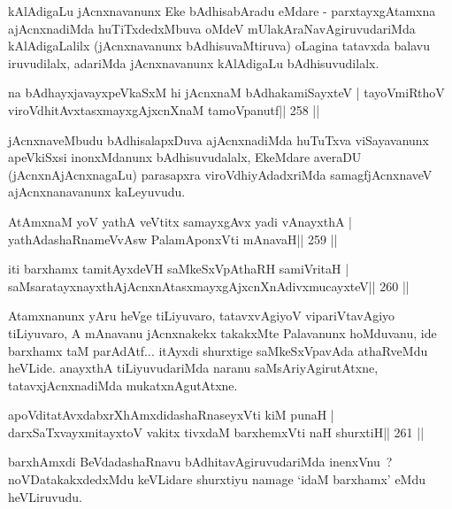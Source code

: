\begin{artha}
kAlAdigaLu jAcnxnavanunx Eke bAdhisabAradu eMdare - parxtayxgAtamxna ajAcnxnadiMda huTiTxdedxMbuva oMdeV mUlakAraNavAgiruvudariMda kAlAdigaLalilx (jAcnxnavanunx bAdhisuvaMtiruva) oLagina tatavxda balavu iruvudilalx, adariMda jAcnxnavanunx kAlAdigaLu bAdhisuvudilalx.
\end{artha}

\begin{shl}
na bAdhayxjavayxpeVkaSxM hi jAcnxnaM bAdhakamiSayxteV |
tayoVmiRthoV viroVdhitAvxtasxmayxgAjxcnXnaM tamoVpanutf\hfill || 258 ||
\end{shl}

\begin{artha}
jAcnxnaveMbudu bAdhisalapxDuva ajAcnxnadiMda huTuTxva viSayavanunx apeVkiSxsi inonxMdanunx bAdhisuvudalalx, EkeMdare averaDU (jAcnxnAjAcnxnagaLu) parasapxra viroVdhiyAdadxriMda samagfjAcnxnaveV ajAcnxnanavanunx kaLeyuvudu.
\end{artha}


\begin{shl}
AtAmxnaM yoV yathA veVtitx samayxgAvx yadi vA\s nayxthA |
yathAdashaRnameVvAsw PalamAponxVti mAnavaH\hfill || 259 ||
\end{shl}

\begin{shl}
iti barxhamx tamitAyxdeVH saMkeSxVpAthaRH samiVritaH |
saMsaratayxnayxthAjAcnxnAtasxmayxgAjxcnXnAdivxmucayxteV\hfill || 260 ||
\end{shl}

\begin{artha}
Atamxnanunx yAru heVge tiLiyuvaro, tatavxvAgiyoV vipariVtavAgiyo tiLiyuvaro, A mAnavanu jAcnxnakekx takakxMte Palavanunx hoMduvanu, ide barxhamx taM parAdAtf... itAyxdi shurxtige saMkeSxVpavAda athaRveMdu heVLide. anayxthA tiLiyuvudariMda naranu saMsAriyAgirutAtxne, tatavxjAcnxnadiMda mukatxnAgutAtxne.
\end{artha}

\begin{shl}
apoVditatAvxdabxrXhAmxdidashaRnaseyxVti kiM punaH |
darxSaTxvayxmitayxtoV vakitx tivxdaM barxhemxVti naH shurxtiH\hfill || 261 ||
\end{shl}

\begin{artha}
barxhAmxdi BeVdadashaRnavu bAdhitavAgiruvudariMda inenxVnu~? noVDatakakxdedxMdu keVLidare shurxtiyu namage `idaM barxhamx' eMdu heVLiruvudu.
\end{artha}

